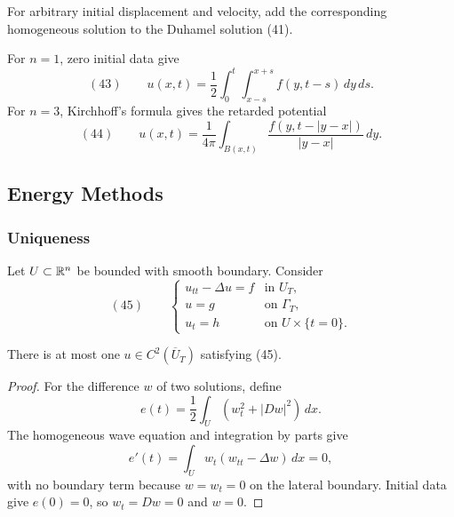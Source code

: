 \begin{remark}
\label{rem:wave-equation-general-nonhomogeneous-solution}

For arbitrary initial displacement and velocity, add the corresponding
homogeneous solution to the Duhamel solution (41).
\end{remark}

\begin{example}[Nonhomogeneous wave equation for $n=1,3$]
\label{ex:wave-equation-nonhomogeneous-n1-n3}

For $n=1$, zero initial data give
$$(43)\qquad
u(x,t)=\frac12\int_0^t\int_{x-s}^{x+s}f(y,t-s)\,dy\,ds.$$
For $n=3$, Kirchhoff's formula gives the retarded potential
$$(44)\qquad
u(x,t)=\frac1{4\pi}\int_{B(x,t)}
\frac{f(y,t-|y-x|)}{|y-x|}\,dy.$$
\end{example}

\subsection{Energy Methods}
\label{sec:wave-energy-methods}

\subsubsection{Uniqueness}
\label{sec:wave-energy-uniqueness}

Let $U\subset\mathbb{R}^n$ be bounded with smooth boundary. Consider
$$(45)\qquad
\begin{cases}
u_{tt}-\Delta u=f&\text{in }U_T,\\
u=g&\text{on }\Gamma_T,\\
u_t=h&\text{on }U\times\{t=0\}.
\end{cases}$$

\begin{theorem}
\label{thm:uniqueness-wave-equation-energy-method}
There is at most one $u\in C^2(\overline U_T)$ satisfying (45).
\end{theorem}
\begin{proof}
\sketch For the difference $w$ of two solutions, define
$$e(t)=\frac12\int_U(w_t^2+|Dw|^2)\,dx.$$
The homogeneous wave equation and integration by parts give
$$e'(t)=\int_Uw_t(w_{tt}-\Delta w)\,dx=0,$$
with no boundary term because $w=w_t=0$ on the lateral boundary. Initial data
give $e(0)=0$, so $w_t=Dw=0$ and $w=0$.
\end{proof}

